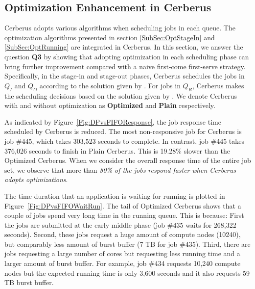 

\subsection{Optimization Enhancement in Cerberus}

Cerberus adopts various algorithms when scheduling jobs in each queue. 
The optimization algorithms presented in section \ref{SubSec:OptStageIn} and \ref{SubSec:OptRunning} are integrated in Cerberus. 
In this section, we answer the question \textbf{Q3} by showing that
adopting optimization in each scheduling phase can bring further improvement
compared with a naive first-come first-serve strategy.
Specifically, in the stage-in and stage-out phases, Cerberus schedules the jobs in $Q_I$ and $Q_O$
according to the solution given by .
For jobs in $Q_R$, Cerberus makes the scheduling decisions
based on the solution given by . %
We denote Cerberus with and without optimization
as \textbf{Optimized} and \textbf{Plain} respectively.

As indicated by Figure~\ref{Fig:DPvsFIFOResponse}, the job response time scheduled by Cerberus is reduced.
The most non-responsive job for Cerberus is job \#445, which takes 303,523 seconds to complete.
In contrast, job \#445 takes 376,026 seconds to finish in Plain Cerberus.
This is 19.28\% slower than the Optimized Cerberus.
When we consider the overall response time of the entire job set,
we observe that more than \textit{80\% of the jobs respond faster when Cerberus adopts optimizations}.

The time duration that an application is waiting for running
is plotted in Figure~\ref{Fig:DPvsFIFOWaitRun}.
The tail of Optimized Cerberus shows that a couple of jobs
spend very long time in the running queue.
This is because: First the jobs are submitted at the early middle phase
(job \#435 waits for 268,322 seconds).
Second, these jobs request a huge
amount of compute nodes (10240), but comparably less amount of burst buffer (7 TB for job \#435).
Third, there are jobs requesting a large number of cores but requesting
less running time and a larger amount of burst buffer.
For example, job \#434 requests 10,240 compute nodes but the expected running time
is only 3,600 seconds and it also requests 59 TB burst buffer.

